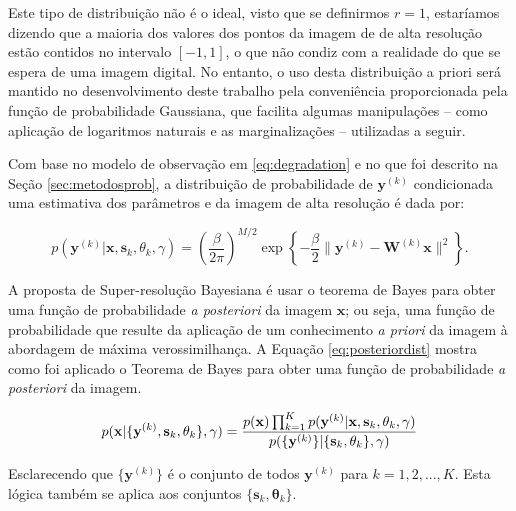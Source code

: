 Este tipo de distribuição não é o ideal, visto que se definirmos $r=1$, estaríamos dizendo que a maioria dos valores dos pontos da imagem de de alta resolução estão contidos no intervalo $[-1,1]$, o que não condiz com a realidade do que se espera de uma imagem digital.
No entanto, o uso desta distribuição a priori será mantido no desenvolvimento deste
trabalho pela conveniência proporcionada pela função de probabilidade Gaussiana, que
facilita algumas manipulações -- como aplicação de logaritmos naturais e as marginalizações --  utilizadas a seguir.

Com base no modelo de observação em \ref{eq:degradation} e no que foi descrito na Seção \ref{sec:metodosprob}, a distribuição de probabilidade de $\mathbf{y}^{(k)}$ condicionada uma estimativa dos parâmetros e da imagem de alta resolução é dada por:

\begin{equation}
	\label{eq:likelihood0}
	p(\mathbf{y}^{(k)} | \mathbf{x}, \mathbf{s}_k, \theta_k, \gamma) = 
	\left(\frac{\beta}{2\pi}\right)^{M/2}
	\exp \left\{ -\frac{\beta}{2} \| \mathbf{y}^{(k)} - \mathbf{W}^{(k)} \mathbf{x} \|^2 \right\}.
\end{equation}


A proposta de Super-resolução Bayesiana é usar o teorema de Bayes para obter uma função
de probabilidade \emph{a posteriori} da imagem $\mathbf{x}$; ou seja, uma função de
probabilidade que resulte da aplicação de um conhecimento \emph{a priori} da imagem à
abordagem de máxima verossimilhança. A Equação \ref{eq:posteriordist} mostra como foi aplicado o Teorema de Bayes para obter uma função de probabilidade \emph{a posteriori} da imagem.

\begin{equation}
	\label{eq:posteriordist}
	p(\mathbf{x}|\{\mathbf{y}^{(k)},\mathbf{s}_k,\theta_k\}, \gamma) = 
	\frac{p(\mathbf{x})\prod^K_{k=1} p(\mathbf{y}^{(k)}|\mathbf{x},\mathbf{s}_k,\theta_k, \gamma)}
	{p(\{\mathbf{y}^{(k)}\}|\{\mathbf{s}_k,\mathbf{\theta}_k\},\gamma)} \\
\end{equation}


Esclarecendo que $\{\mathbf{y}^{(k)}\}$ é o conjunto de todos $\mathbf{y}^{(k)}$ para $k = 1,2,...,K$.
Esta lógica também se aplica aos conjuntos $\{\mathbf{s}_k,\mathbf{\theta}_k\}$.

